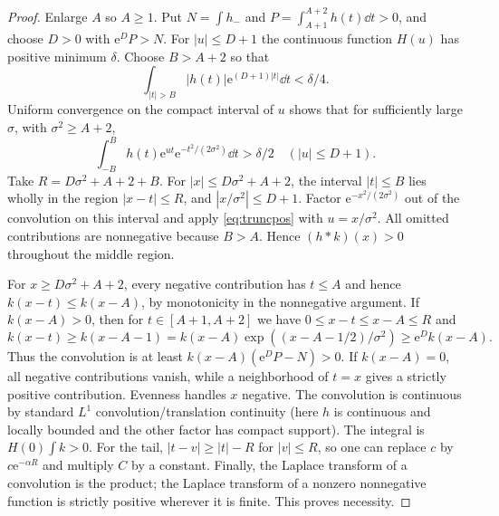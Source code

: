 \documentclass[11pt]{article}
\theoremstyle{remark}\newtheorem{remark}[theorem]{Remark}
\newcommand{\ee}{\mathrm e}\newcommand{\abs}[1]{\lvert#1\rvert}
\begin{document}
\begin{proof}
Enlarge $A$ so $A\ge1$. Put $N=\int h_-$ and $P=\int_{A+1}^{A+2}h(t)\dd t>0$, and choose $D>0$ with $\ee^D P>N$. For $|u|\le D+1$ the continuous function $H(u)$ has positive minimum $\delta$. Choose $B>A+2$ so that
\[
 \int_{|t|>B}|h(t)|\ee^{(D+1)|t|}\dd t<\delta/4.
\]
Uniform convergence on the compact interval of $u$ shows that for sufficiently large $\sigma$, with $\sigma^2\ge A+2$,
\begin{equation}\label{eq:truncpos}
 \int_{-B}^B h(t)\ee^{ut}\ee^{-t^2/(2\sigma^2)}\dd t>\delta/2\quad (|u|\le D+1).
\end{equation}
Take $R=D\sigma^2+A+2+B$. For $|x|\le D\sigma^2+A+2$, the interval $|t|\le B$ lies wholly in the region $|x-t|\le R$, and $|x/\sigma^2|\le D+1$. Factor $\ee^{-x^2/(2\sigma^2)}$ out of the convolution on this interval and apply \eqref{eq:truncpos} with $u=x/\sigma^2$. All omitted contributions are nonnegative because $B>A$. Hence $(h*k)(x)>0$ throughout the middle region.

For $x\ge D\sigma^2+A+2$, every negative contribution has $t\le A$ and hence $k(x-t)\le k(x-A)$, by monotonicity in the nonnegative argument. If $k(x-A)>0$, then for $t\in[A+1,A+2]$ we have $0\le x-t\le x-A\le R$ and
\[
 k(x-t)\ge k(x-A-1)=k(x-A)\exp((x-A-1/2)/\sigma^2)\ge\ee^D k(x-A).
\]
Thus the convolution is at least $k(x-A)(\ee^DP-N)>0$. If $k(x-A)=0$, all negative contributions vanish, while a neighborhood of $t=x$ gives a strictly positive contribution. Evenness handles $x$ negative. The convolution is continuous by standard $L^1$ convolution/translation continuity (here $h$ is continuous and locally bounded and the other factor has compact support). The integral is $H(0)\int k>0$. For the tail, $|t-v|\ge |t|-R$ for $|v|\le R$, so one can replace $c$ by $c\ee^{-\alpha R}$ and multiply $C$ by a constant. Finally, the Laplace transform of a convolution is the product; the Laplace transform of a nonzero nonnegative function is strictly positive wherever it is finite. This proves necessity.
\end{proof}
\end{document}
